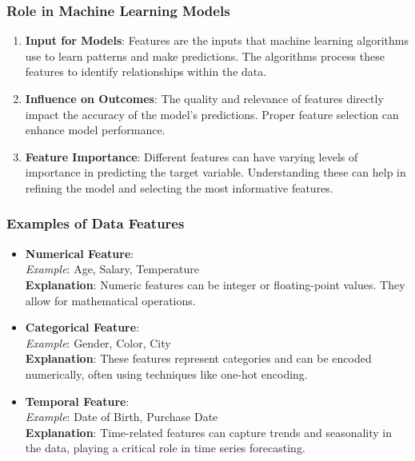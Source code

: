\documentclass[aspectratio=169]{beamer}
\begin{document}
\begin{frame}[fragile]
    \frametitle{Role in Machine Learning Models}
    \begin{enumerate}
        \item \textbf{Input for Models}: Features are the inputs that machine learning algorithms use to learn patterns and make predictions. The algorithms process these features to identify relationships within the data.
        
        \item \textbf{Influence on Outcomes}: The quality and relevance of features directly impact the accuracy of the model’s predictions. Proper feature selection can enhance model performance.
        
        \item \textbf{Feature Importance}: Different features can have varying levels of importance in predicting the target variable. Understanding these can help in refining the model and selecting the most informative features.
    \end{enumerate}
\end{frame}

\begin{frame}[fragile]
    \frametitle{Examples of Data Features}
    \begin{itemize}
        \item \textbf{Numerical Feature}: \\
            \textit{Example}: Age, Salary, Temperature \\
            \textbf{Explanation}: Numeric features can be integer or floating-point values. They allow for mathematical operations.
        
        \item \textbf{Categorical Feature}: \\
            \textit{Example}: Gender, Color, City \\
            \textbf{Explanation}: These features represent categories and can be encoded numerically, often using techniques like one-hot encoding.
        
        \item \textbf{Temporal Feature}: \\
            \textit{Example}: Date of Birth, Purchase Date \\
            \textbf{Explanation}: Time-related features can capture trends and seasonality in the data, playing a critical role in time series forecasting.
    \end{itemize}
\end{frame}
\end{document}
